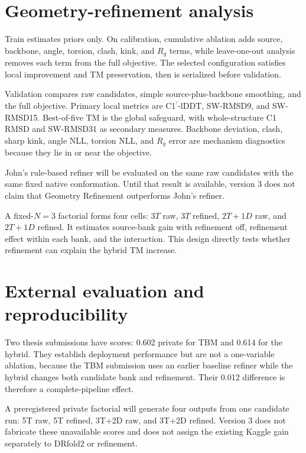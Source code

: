 \documentclass[12pt,a4paper,oneside]{report}
\newcommand{\cprime}{C1$^{\prime}$}
\begin{document}
\section{Geometry-refinement analysis}

Train estimates priors only. On calibration, cumulative ablation adds source, backbone,
angle, torsion, clash, kink, and $R_g$ terms, while leave-one-out analysis removes each
term from the full objective. The selected configuration satisfies local improvement and
TM preservation, then is serialized before validation.

Validation compares raw candidates, simple source-plus-backbone smoothing, and the full
objective. Primary local metrics are \cprime{}-lDDT, SW-RMSD9, and SW-RMSD15. Best-of-five
TM is the global safeguard, with whole-structure C1 RMSD and SW-RMSD31 as secondary
measures. Backbone deviation, clash, sharp kink, angle NLL, torsion NLL, and $R_g$ error
are mechanism diagnostics because they lie in or near the objective.

John's rule-based refiner will be evaluated on the same raw candidates with the same
fixed native conformation. Until that result is available, version 3 does not claim that
Geometry Refinement outperforms John's refiner.

A fixed-$N=3$ factorial forms four cells: $3T$ raw, $3T$ refined, $2T+1D$ raw, and
$2T+1D$ refined. It estimates source-bank gain with refinement off, refinement effect
within each bank, and the interaction. This design directly tests whether refinement can
explain the hybrid TM increase.

\section{External evaluation and reproducibility}

Two thesis submissions have scores: 0.602 private for TBM and 0.614 for the hybrid. They
establish deployment performance but are not a one-variable ablation, because the TBM
submission uses an earlier baseline refiner while the hybrid changes both candidate bank
and refinement. Their 0.012 difference is therefore a complete-pipeline effect.

A preregistered private factorial will generate four outputs from one candidate run:
5T raw, 5T refined, 3T+2D raw, and 3T+2D refined. Version 3 does not fabricate these
unavailable scores and does not assign the existing Kaggle gain separately to DRfold2 or
refinement.
\end{document}
